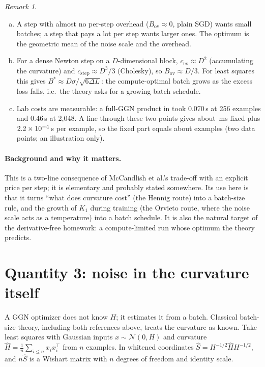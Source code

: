 \documentclass[11pt,a4paper]{article}
\newcommand{\Bov}{B_{\mathrm{ov}}}
\newcommand{\study}[1]{\path{#1}}
\theoremstyle{plain}
\theoremstyle{definition}
\theoremstyle{remark}
\newtheorem{remark}[proposition]{Remark}
\begin{document}
\begin{remark}\leavevmode
\begin{enumerate}[(a),nosep]
\item A step with almost no per-step overhead ($\Bov\approx0$, plain SGD) wants small batches; a step that pays a
  lot per step wants larger ones. The optimum is the geometric mean of the noise scale and the overhead.
\item For a dense Newton step on a $D$-dimensional block, $c_{\mathrm{ex}}\approx D^2$ (accumulating the curvature)
  and $c_{\mathrm{step}}\approx D^3/3$ (Cholesky), so $\Bov\approx D/3$. For least squares this gives
  $B^*\approx D\sigma/\sqrt{6\Delta L}$: the compute-optimal batch grows as the excess loss falls, i.e.\ the theory
  asks for a growing batch schedule.
\item Lab costs are measurable: a full-GGN product in \study{bulk_krylov_20261014} took 0.070\,s at 256 examples and
  0.46\,s at 2{,}048. A line through these two points gives about \NumLabIntercept\,ms fixed plus
  $2.2\times10^{-4}$\,s per example, so the fixed part equals about \NumLabBov{} examples (two data points;
  an illustration only).
\end{enumerate}
\end{remark}

\paragraph{Background and why it matters.} This is a two-line consequence of McCandlish et al.'s trade-off with an
explicit price per step; it is elementary and probably stated somewhere. Its use here is that it turns ``what does
curvature cost'' (the Hennig route) into a batch-size rule, and the growth of $K_1$ during training (the Orvieto
route, where the noise scale acts as a temperature) into a batch schedule. It is also the natural target of the
derivative-free homework: a compute-limited run whose optimum the theory predicts.

\section{Quantity 3: noise in the curvature itself}\label{sec:curv}

A GGN optimizer does not know $H$; it estimates it from a batch. Classical batch-size theory, including both
references above, treats the curvature as known. Take least squares with Gaussian inputs $x\sim\mathcal N(0,H)$ and
curvature $\hat H=\frac1n\sum_{i\le n}x_ix_i^\top$ from $n$ examples. In whitened coordinates
$\hat S=H^{-1/2}\hat H H^{-1/2}$, and $n\hat S$ is a Wishart matrix with $n$ degrees of freedom and identity scale.
\end{document}
